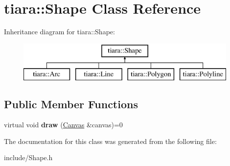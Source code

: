 \hypertarget{classtiara_1_1Shape}{}\section{tiara\+::Shape Class Reference}
\label{classtiara_1_1Shape}
Inheritance diagram for tiara\+::Shape\+:\begin{figure}[H]
\begin{center}
\leavevmode
\includegraphics[height=2.000000cm]{classtiara_1_1Shape}
\end{center}
\end{figure}
\subsection*{Public Member Functions}
\begin{DoxyCompactItemize}
\item 
\mbox{\label{classtiara_1_1Shape_a2db1320dbdf1d967ffc4fdc7d7ca2c41}} 
virtual void {\bfseries draw} (\mbox{\hyperlink{classtiara_1_1Canvas}{Canvas}} \&canvas)=0
\end{DoxyCompactItemize}


The documentation for this class was generated from the following file\+:\begin{DoxyCompactItemize}
\item 
include/Shape.\+h\end{DoxyCompactItemize}

